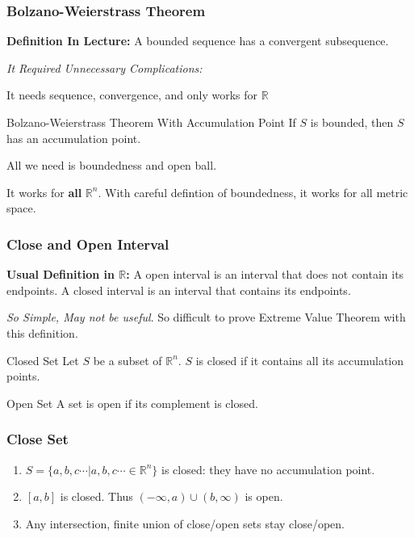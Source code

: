 \documentclass{beamer}
\begin{document}
\begin{frame}
\frametitle{Bolzano-Weierstrass Theorem}
\textbf{Definition In Lecture: } A bounded sequence has a convergent subsequence.

\textit{It Required Unnecessary Complications: }

It needs sequence, convergence, and only works for $\mathbb{R}$
\vfill
\begin{alertblock}{Bolzano-Weierstrass Theorem With Accumulation Point}
	If $S$ is bounded, then $S$ has an accumulation point.
\end{alertblock}

All we need is boundedness and open ball.

It works for \textbf{all} $\mathbb{R}^n$.
With careful defintion of boundedness, it works for all metric space.
\end{frame}

\begin{frame}
	\frametitle{Close and Open Interval}
	\textbf{Usual Definition in $\mathbb{R}$:} A open interval is an interval that does not contain its endpoints. A closed interval is an interval that contains its endpoints.

	\textit{So Simple, May not be useful}. So difficult to prove Extreme Value Theorem with this definition.
	\begin{block}{Closed Set}
		Let $S$ be a subset of $\mathbb{R}^n$. 
		$S$ is closed if it contains all its accumulation points.
	\end{block}
	\begin{block}{ Open Set } 
		A set is open if its complement is closed.
	\end{block}
\end{frame}
\begin{frame}
	\frametitle{Close Set}


\begin{examples}
	\begin{enumerate}
		\item $S = \{a, b, c \cdots|a,b,c \cdots \in \mathbb{R}^n\}$ is closed: they have no accumulation point.
		\item $[a, b]$ is closed. Thus $(-\infty, a) \cup (b, \infty)$ is open.
		\item Any intersection, finite union of close/open sets stay close/open.
	\end{enumerate}
\end{examples}



\end{frame}
\end{document}
